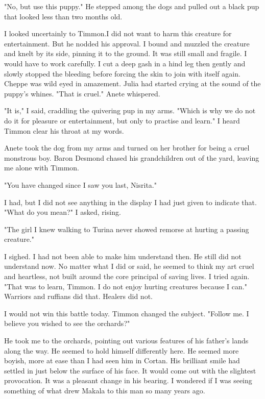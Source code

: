 \documentclass{article}
\begin{document}
"No, but use this puppy." He stepped among the dogs and pulled out a black pup that looked less than two months old.

I looked uncertainly to Timmon.I did not want to harm this creature for entertainment. But he nodded his approval. I bound and muzzled the creature and knelt by its side, pinning it to the ground. It was still small and fragile. I would have to work carefully. I cut a deep gash in a hind leg then gently and slowly stopped the bleeding  before forcing the skin to join with itself again. Cheppe was wild eyed in amazement. Julia had started crying at the sound of the puppy's whines. "That is cruel." Anete whispered. 

"It is," I said, craddling the quivering pup in my arms. "Which is why we do not do it for pleasure or entertainment, but only to practise and learn." I heard Timmon clear his throat at my words.

Anete took the dog from my arms and turned on her brother for being a cruel monstrous boy. Baron Desmond chased his grandchildren out of the yard, leaving me alone with Timmon.

"You have changed since I saw you last, Nisrita."

I had, but I did not see anything in the display I had just given to indicate that. "What do you mean?" I asked, rising.

"The girl I knew walking to Turina never showed remorse at hurting a passing creature."

I sighed. I had not been able to make him understand then. He still did not understand now. No matter what I did or said, he seemed to think my art cruel and heartless, not built around the core principal of saving lives. I tried again. "That was to learn, Timmon. I do not enjoy hurting creatures because I can." Warriors and ruffians did that. Healers did not.

I would not win this battle today. Timmon changed the subject. "Follow me. I believe you wished to see the orchards?"

He took me to the orchards, pointing out various features of his father's lands along the way. He seemed to hold himself differently here. He seemed more boyish, more at ease than I had seen him in Cortan. His brilliant smile had settled in just below the surface of his face. It would come out with the slightest provocation. It was a pleasant change in his bearing. I wondered if I was seeing something of what drew Makala to this man so many years ago. 
\end{document}
